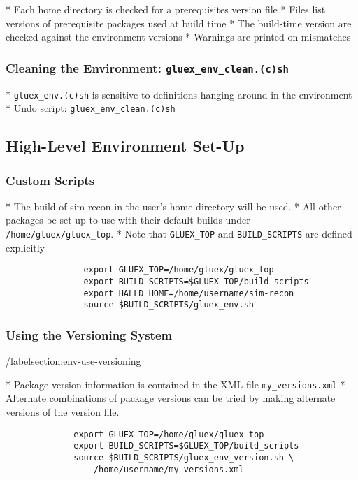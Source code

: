 \documentclass[12pt]{article}
\begin{document}
* Each home directory is checked for a prerequisites version file
* Files list versions of prerequisite packages used at build time
* The build-time version are checked against the environment versions
* Warnings are printed on mismatches

\subsubsection{Cleaning the Environment: {\tt gluex\_env\_clean.(c)sh}}

* {\tt gluex\_env.(c)sh} is sensitive to definitions hanging
around in the environment
* Undo script: {\tt gluex\_env\_clean.(c)sh}

\subsection{High-Level Environment Set-Up}

\subsubsection{Custom Scripts}\label{section:custom-scripts}

* The build of sim-recon in the user's home directory will be used.
* All other packages be set up to use with their default builds under {\tt
    /home/gluex/gluex\_top}.
* Note that {\tt GLUEX\_TOP} and {\tt BUILD\_SCRIPTS} are defined explicitly

\begin{figure}
\begin{verbatim}
          export GLUEX_TOP=/home/gluex/gluex_top
          export BUILD_SCRIPTS=$GLUEX_TOP/build_scripts
          export HALLD_HOME=/home/username/sim-recon
          source $BUILD_SCRIPTS/gluex_env.sh
\end{verbatim}
\end{figure}

\subsubsection{Using the Versioning System}/label{section:env-use-versioning}

* Package version information is contained in the XML file {\tt my\_versions.xml}
* Alternate combinations of package versions can be tried by making alternate versions of the version file.

\begin{figure}
\begin{verbatim}
        export GLUEX_TOP=/home/gluex/gluex_top
        export BUILD_SCRIPTS=$GLUEX_TOP/build_scripts
        source $BUILD_SCRIPTS/gluex_env_version.sh \
            /home/username/my_versions.xml
\end{verbatim}
\end{figure}
\end{document}
